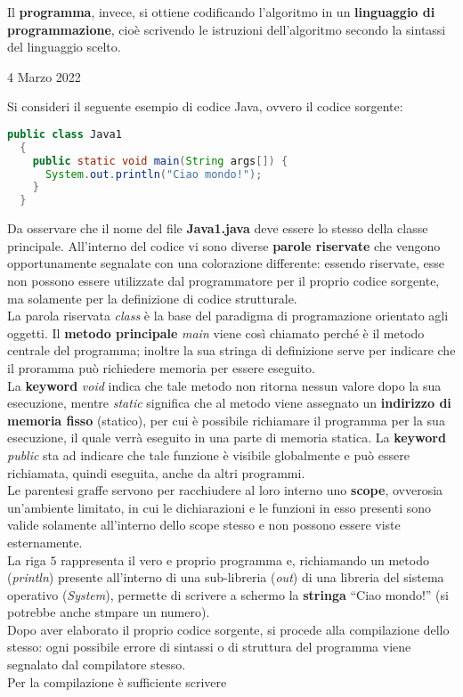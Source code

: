 \documentclass[a4paper]{extarticle}
\newcommand{\quotes}[1]{``#1''}
\begin{document}
\vspace{1em}
\noindent
Il \textbf{programma}, invece, si ottiene codificando l’algoritmo in un \textbf{linguaggio di programmazione}, cioè scrivendo le istruzioni dell’algoritmo secondo la sintassi del linguaggio scelto.

\newpage
\begin{center}
  4 Marzo 2022
\end{center}

Si consideri il seguente esempio di codice Java, ovvero il codice sorgente:

\begin{lstlisting}[language=Java, caption=Esempio di codice sorgente in Java]
  public class Java1
  {
    public static void main(String args[]) {
      System.out.println("Ciao mondo!");
    }
  }
\end{lstlisting}

\vspace{1em}
\noindent
Da osservare che il nome del file \textbf{Java1.java} deve essere lo stesso della classe principale. All'interno del codice vi sono diverse \textbf{parole riservate} che vengono opportunamente segnalate con una colorazione differente: essendo riservate, esse non possono essere utilizzate dal programmatore per il proprio codice sorgente, ma solamente per la definizione di codice strutturale.\\
La parola riservata \emph{class} è la base del paradigma di programazione orientato agli oggetti. Il \textbf{metodo principale} \emph{main} viene così chiamato perché è il metodo centrale del programma; inoltre la sua stringa di definizione serve per indicare che il proramma può richiedere memoria per essere eseguito.\\
La \textbf{keyword} \emph{void} indica che tale metodo non ritorna nessun valore dopo la sua esecuzione, mentre \emph{static} significa che al metodo viene assegnato un \textbf{indirizzo di memoria fisso} (statico), per cui è possibile richiamare il programma per la sua esecuzione, il quale verrà eseguito in una parte di memoria statica. La \textbf{keyword} \emph{public} sta ad indicare che tale funzione è visibile globalmente e può essere richiamata, quindi eseguita, anche da altri programmi.\\
Le parentesi graffe servono per racchiudere al loro interno uno \textbf{scope}, ovverosia un'ambiente limitato, in cui le dichiarazioni e le funzioni in esso presenti sono valide solamente all'interno dello scope stesso e non possono essere viste esternamente.\\
La riga $5$ rappresenta il vero e proprio programma e, richiamando un metodo (\emph{println}) presente all'interno di una sub-libreria (\emph{out}) di una libreria del sistema operativo (\emph{System}), permette di scrivere a schermo la \textbf{stringa} \quotes{Ciao mondo!} (si potrebbe anche stmpare un numero).\\
Dopo aver elaborato il proprio codice sorgente, si procede alla compilazione dello stesso: ogni possibile errore di sintassi o di struttura del programma viene segnalato dal compilatore stesso.\\
Per la compilazione è sufficiente scrivere
\end{document}
